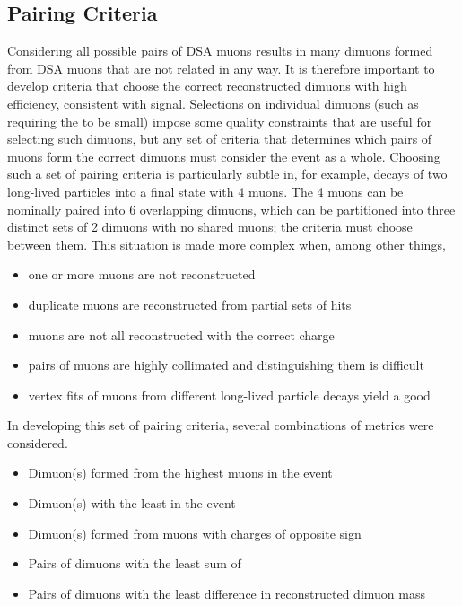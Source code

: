 \subsection{Pairing Criteria}
\label{sec:dd:PC}
Considering all possible pairs of DSA muons results in many dimuons formed from DSA muons that are not related in any way.
It is therefore important to develop criteria that choose the correct reconstructed dimuons with high efficiency, consistent with signal.
Selections on individual dimuons (such as requiring the \vchisq to be small) impose some quality constraints that are useful for selecting such dimuons, but any set of criteria that determines which pairs of muons form the correct dimuons must consider the event as a whole.
Choosing such a set of pairing criteria is particularly subtle in, for example, decays of two long-lived particles into a final state with 4 muons.
The 4 muons can be nominally paired into 6 overlapping dimuons, which can be partitioned into three distinct sets of 2 dimuons with no shared muons; the criteria must choose between them.
This situation is made more complex when, among other things,
\begin{itemize}
  \setlength\itemsep{.2\baselineskip}
  \item one or more muons are not reconstructed
  \item duplicate muons are reconstructed from partial sets of hits
  \item muons are not all reconstructed with the correct charge
  \item pairs of muons are highly collimated and distinguishing them is difficult
  \item vertex fits of muons from different long-lived particle decays yield a good \vchisq
\end{itemize}
In developing this set of pairing criteria, several combinations of metrics were considered.
\begin{itemize}
  \setlength\itemsep{.2\baselineskip}
  \item Dimuon(s) formed from the highest \pT muons in the event
  \item Dimuon(s) with the least \vchisq in the event
  \item Dimuon(s) formed from muons with charges of opposite sign
  \item Pairs of dimuons with the least sum of \vchisq
  \item Pairs of dimuons with the least difference in reconstructed dimuon mass
\end{itemize}
